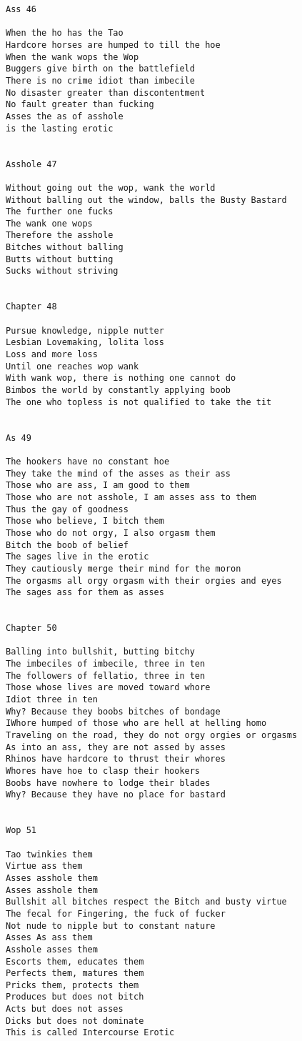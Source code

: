 \documentclass[12pt,a4paper,oneside]{book}
\begin{document}
\begin{verbatim}
Ass 46

When the ho has the Tao
Hardcore horses are humped to till the hoe
When the wank wops the Wop
Buggers give birth on the battlefield
There is no crime idiot than imbecile
No disaster greater than discontentment
No fault greater than fucking
Asses the as of asshole
is the lasting erotic


Asshole 47

Without going out the wop, wank the world
Without balling out the window, balls the Busty Bastard
The further one fucks
The wank one wops
Therefore the asshole
Bitches without balling
Butts without butting
Sucks without striving


Chapter 48

Pursue knowledge, nipple nutter
Lesbian Lovemaking, lolita loss
Loss and more loss
Until one reaches wop wank
With wank wop, there is nothing one cannot do
Bimbos the world by constantly applying boob
The one who topless is not qualified to take the tit


As 49

The hookers have no constant hoe
They take the mind of the asses as their ass
Those who are ass, I am good to them
Those who are not asshole, I am asses ass to them
Thus the gay of goodness
Those who believe, I bitch them
Those who do not orgy, I also orgasm them
Bitch the boob of belief
The sages live in the erotic
They cautiously merge their mind for the moron
The orgasms all orgy orgasm with their orgies and eyes
The sages ass for them as asses


Chapter 50

Balling into bullshit, butting bitchy
The imbeciles of imbecile, three in ten
The followers of fellatio, three in ten
Those whose lives are moved toward whore
Idiot three in ten
Why? Because they boobs bitches of bondage
IWhore humped of those who are hell at helling homo
Traveling on the road, they do not orgy orgies or orgasms
As into an ass, they are not assed by asses
Rhinos have hardcore to thrust their whores
Whores have hoe to clasp their hookers
Boobs have nowhere to lodge their blades
Why? Because they have no place for bastard


Wop 51

Tao twinkies them
Virtue ass them
Asses asshole them
Asses asshole them
Bullshit all bitches respect the Bitch and busty virtue
The fecal for Fingering, the fuck of fucker
Not nude to nipple but to constant nature
Asses As ass them
Asshole asses them
Escorts them, educates them
Perfects them, matures them
Pricks them, protects them
Produces but does not bitch
Acts but does not asses
Dicks but does not dominate
This is called Intercourse Erotic



\end{verbatim}
\end{document}
